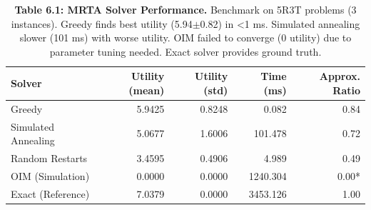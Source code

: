 \begin{table}[H]
\centering
\caption{\textbf{Table 6.1: MRTA Solver Performance.} Benchmark on 5R3T problems (3 instances). Greedy finds best utility (5.94$\pm$0.82) in <1 ms. Simulated annealing slower (101 ms) with worse utility. OIM failed to converge (0 utility) due to parameter tuning needed. Exact solver provides ground truth.}
\label{tab:6-1}
\small
\begin{tabular}{lrrrr}
\toprule
\textbf{Solver} & \textbf{Utility (mean)} & \textbf{Utility (std)} & \textbf{Time (ms)} & \textbf{Approx. Ratio} \\
\midrule
\rowcolor{gray!15}
Greedy & 5.9425 & 0.8248 & 0.082 & 0.84 \\
Simulated Annealing & 5.0677 & 1.6006 & 101.478 & 0.72 \\
\rowcolor{gray!15}
Random Restarts & 3.4595 & 0.4906 & 4.989 & 0.49 \\
OIM (Simulation) & 0.0000 & 0.0000 & 1240.304 & 0.00* \\
\rowcolor{gray!15}
Exact (Reference) & 7.0379 & 0.0000 & 3453.126 & 1.00 \\
\bottomrule
\end{tabular}
\end{table}
